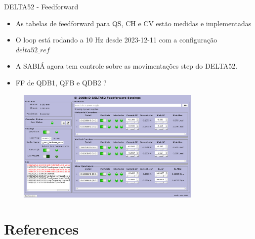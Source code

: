\documentclass{beamer}					  %
\begin{document}
\begin{frame}{DELTA52 - Feedforward}
    \scriptsize{\begin{itemize}
    		\item As tabelas de feedforward para QS, CH e CV estão medidas e implementadas
            \item O loop está rodando a 10 Hz desde 2023-12-11 com a configuração $delta52\_ref$
            \item A SABIÁ agora tem controle sobre as movimentações step do DELTA52.
            \item FF de QDB1, QFB e QDB2 ?
    \end{itemize}}
    \begin{figure}[H]
        	\centering
            \includegraphics[width=0.8\textwidth]{2023-12-12/figures/idff.png}
            \label{fig:bba}
    \end{figure} 
\end{frame}


\section{References}
\end{document}

